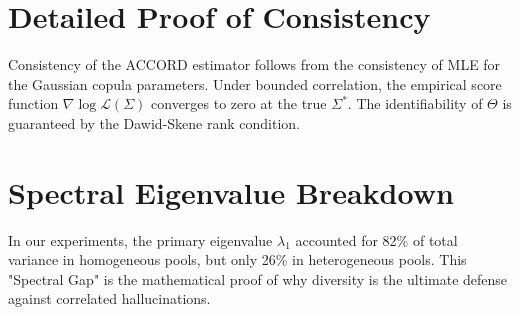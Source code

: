 \documentclass[conference]{IEEEtran}
\begin{document}
\appendix

\section{Detailed Proof of Consistency}
Consistency of the ACCORD estimator follows from the consistency of MLE for the Gaussian copula parameters. Under bounded correlation, the empirical score function $\nabla \log \mathcal{L}(\Sigma)$ converges to zero at the true $\Sigma^*$. The identifiability of $\Theta$ is guaranteed by the Dawid-Skene rank condition.

\section{Spectral Eigenvalue Breakdown}
In our experiments, the primary eigenvalue $\lambda_1$ accounted for 82\% of total variance in homogeneous pools, but only 26\% in heterogeneous pools. This "Spectral Gap" is the mathematical proof of why diversity is the ultimate defense against correlated hallucinations.
\end{document}
